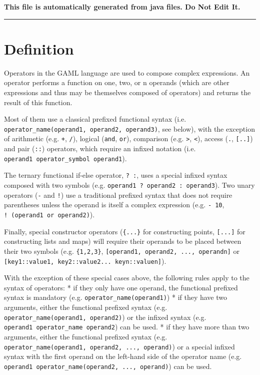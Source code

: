 \documentclass[]{book}
\theoremstyle{definition}
\theoremstyle{definition}
\theoremstyle{definition}
\theoremstyle{remark}
\begin{document}
\textbf{This file is automatically generated from java files. Do Not
Edit It.}

\begin{center}\rule{0.5\linewidth}{\linethickness}\end{center}

\section{Definition}\label{definition-3}

Operators in the GAML language are used to compose complex expressions.
An operator performs a function on one, two, or n operands (which are
other expressions and thus may be themselves composed of operators) and
returns the result of this function.

Most of them use a classical prefixed functional syntax (i.e.
\texttt{operator\_name(operand1,\ operand2,\ operand3)}, see below),
with the exception of arithmetic (e.g. \texttt{+}, \texttt{/}), logical
(\texttt{and}, \texttt{or}), comparison (e.g. \texttt{\textgreater{}},
\texttt{\textless{}}), access (\texttt{.}, \texttt{{[}..{]}}) and pair
(\texttt{::}) operators, which require an infixed notation (i.e.
\texttt{operand1\ operator\_symbol\ operand1}).

The ternary functional if-else operator, \texttt{?\ :}, uses a special
infixed syntax composed with two symbols (e.g.
\texttt{operand1\ ?\ operand2\ :\ operand3}). Two unary operators
(\texttt{-} and \texttt{!}) use a traditional prefixed syntax that does
not require parentheses unless the operand is itself a complex
expression (e.g. \texttt{-\ 10}, \texttt{!\ (operand1\ or\ operand2)}).

Finally, special constructor operators (\texttt{\{...\}} for
constructing points, \texttt{{[}...{]}} for constructing lists and maps)
will require their operands to be placed between their two symbols (e.g.
\texttt{\{1,2,3\}}, \texttt{{[}operand1,\ operand2,\ ...,\ operandn{]}}
or \texttt{{[}key1::value1,\ key2::value2...\ keyn::valuen{]}}).

With the exception of these special cases above, the following rules
apply to the syntax of operators: * if they only have one operand, the
functional prefixed syntax is mandatory (e.g.
\texttt{operator\_name(operand1)}) * if they have two arguments, either
the functional prefixed syntax (e.g.
\texttt{operator\_name(operand1,\ operand2)}) or the infixed syntax
(e.g. \texttt{operand1\ operator\_name\ operand2}) can be used. * if
they have more than two arguments, either the functional prefixed syntax
(e.g. \texttt{operator\_name(operand1,\ operand2,\ ...,\ operand)}) or a
special infixed syntax with the first operand on the left-hand side of
the operator name (e.g.
\texttt{operand1\ operator\_name(operand2,\ ...,\ operand)}) can be
used.
\end{document}
